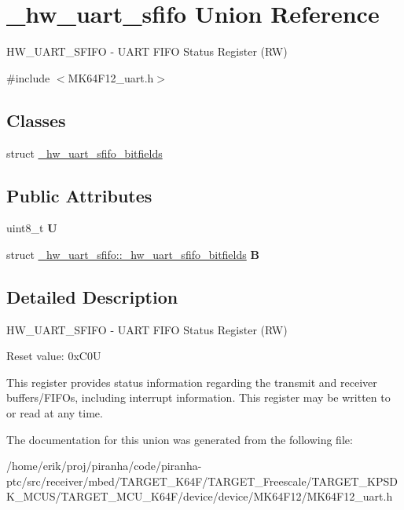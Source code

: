 \hypertarget{union__hw__uart__sfifo}{}\section{\+\_\+hw\+\_\+uart\+\_\+sfifo Union Reference}
\label{union__hw__uart__sfifo}


H\+W\+\_\+\+U\+A\+R\+T\+\_\+\+S\+F\+I\+FO -\/ U\+A\+RT F\+I\+FO Status Register (RW)  




{\ttfamily \#include $<$M\+K64\+F12\+\_\+uart.\+h$>$}

\subsection*{Classes}
\begin{DoxyCompactItemize}
\item 
struct \hyperlink{struct__hw__uart__sfifo_1_1__hw__uart__sfifo__bitfields}{\+\_\+hw\+\_\+uart\+\_\+sfifo\+\_\+bitfields}
\end{DoxyCompactItemize}
\subsection*{Public Attributes}
\begin{DoxyCompactItemize}
\item 
uint8\+\_\+t {\bfseries U}\hypertarget{union__hw__uart__sfifo_a6825c4f9a38dfcacfa43756083ac89c8}{}\label{union__hw__uart__sfifo_a6825c4f9a38dfcacfa43756083ac89c8}

\item 
struct \hyperlink{struct__hw__uart__sfifo_1_1__hw__uart__sfifo__bitfields}{\+\_\+hw\+\_\+uart\+\_\+sfifo\+::\+\_\+hw\+\_\+uart\+\_\+sfifo\+\_\+bitfields} {\bfseries B}\hypertarget{union__hw__uart__sfifo_a85e09c2c7c943198198a2beadf7ff9b2}{}\label{union__hw__uart__sfifo_a85e09c2c7c943198198a2beadf7ff9b2}

\end{DoxyCompactItemize}


\subsection{Detailed Description}
H\+W\+\_\+\+U\+A\+R\+T\+\_\+\+S\+F\+I\+FO -\/ U\+A\+RT F\+I\+FO Status Register (RW) 

Reset value\+: 0x\+C0U

This register provides status information regarding the transmit and receiver buffers/\+F\+I\+F\+Os, including interrupt information. This register may be written to or read at any time. 

The documentation for this union was generated from the following file\+:\begin{DoxyCompactItemize}
\item 
/home/erik/proj/piranha/code/piranha-\/ptc/src/receiver/mbed/\+T\+A\+R\+G\+E\+T\+\_\+\+K64\+F/\+T\+A\+R\+G\+E\+T\+\_\+\+Freescale/\+T\+A\+R\+G\+E\+T\+\_\+\+K\+P\+S\+D\+K\+\_\+\+M\+C\+U\+S/\+T\+A\+R\+G\+E\+T\+\_\+\+M\+C\+U\+\_\+\+K64\+F/device/device/\+M\+K64\+F12/M\+K64\+F12\+\_\+uart.\+h\end{DoxyCompactItemize}
